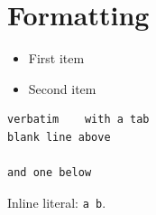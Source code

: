 \documentclass{article}
\begin{document}
\section{Formatting}

\begin{itemize}
\item First item
\item Second item
\end{itemize}

\begin{verbatim}
verbatim	with a tab
blank line above

and one below
\end{verbatim}

Inline literal: \verb|a	b|.
\end{document}
